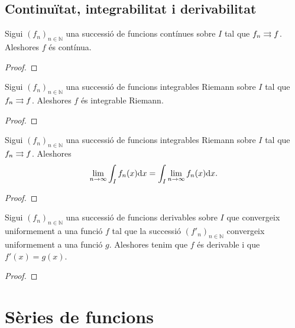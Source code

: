 \documentclass[../Apunts.tex]{subfiles}
\begin{document}
	\subsection{Continuïtat, integrabilitat i derivabilitat}
	\begin{theorem}
		\label{thm:si una successió de funcions contínues convergeix uniformement, ho fa a una funció contínua}
		Sigui \((f_{n})_{n\in\mathbb{N}}\) una successió de funcions contínues sobre \(I\) tal que \(f_{n}\rightrightarrows f\). Aleshores \(f\) és contínua.
		\begin{proof}
		\end{proof}
	\end{theorem}
	\begin{theorem}
		\label{thm:si una successió de funcions integrables Riemann convergix unifoemement, ho fa a una funció integrable Riemann}
		Sigui \((f_{n})_{n\in\mathbb{N}}\) una successió de funcions integrables Riemann sobre \(I\) tal que \(f_{n}\rightrightarrows f\). Aleshores \(f\) és integrable Riemann.
		\begin{proof}
		\end{proof}
	\end{theorem}
	\begin{theorem}
		\label{thm:si una successió de funcions convergeix uniformement aleshores el límit de la integral dels elements de la succesió és la integral del límit dels elements de la successió}
		Sigui \((f_{n})_{n\in\mathbb{N}}\) una successió de funcions integrables Riemann sobre \(I\) tal que \(f_{n}\rightrightarrows f\). Aleshores
		\[\lim_{n\to\infty}\int_{I}f_{n}(x)\textrm{d} x=\int_{I}\lim_{n\to\infty}f_{n}(x)\textrm{d} x.\]
		\begin{proof}
		\end{proof}
	\end{theorem}
	\begin{theorem}
		Sigui \((f_{n})_{n\in\mathbb{N}}\) una successió de funcions derivables sobre \(I\) que convergeix uniformement a una funció \(f\) tal que la successió \((f'_{n})_{n\in\mathbb{N}}\) convergeix uniformement a una funció \(g\). Aleshores tenim que \(f\) és derivable i que \(f'(x)=g(x)\).
		\begin{proof}
		\end{proof}
	\end{theorem}
	\section{Sèries de funcions}
\end{document}
